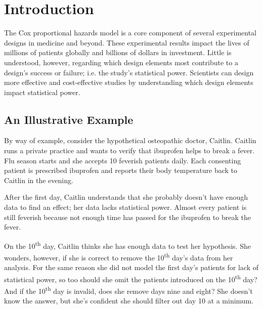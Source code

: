 \section{Introduction}

The Cox proportional hazards model \cite{cox} is a core component of several experimental designs in medicine and beyond. These experimental results impact the lives of millions of patients globally and billions of dollars in investment. Little is understood, however, regarding which design elements most contribute to a design's success or failure; i.e. the study's statistical power. Scientists can design more effective and cost-effective studies by understanding which design elements impact statistical power\footnotemark.


\subsection{An Illustrative Example}

By way of example, consider the hypothetical osteopathic doctor, Caitlin. Caitlin runs a private practice and wants to verify that ibuprofen helps to break a fever. Flu season starts and she accepts 10 feverish patients daily. Each consenting patient is prescribed ibuprofen and reports their body temperature back to Caitlin in the evening. 

After the first day, Caitlin understands that she probably doesn't have enough data to find an effect; her data lacks statistical power. Almost every patient is still feverish because not enough time has passed for the ibuprofen to break the fever. 

On the 10\textsuperscript{th} day, Caitlin thinks she has enough data to test her hypothesis. She wonders, however, if she is correct to remove the 10\textsuperscript{th} day's data from her analysis. For the same reason she did not model the first day's patients for lack of statistical power, so too should she omit the patients introduced on the 10\textsuperscript{th} day? And if the 10\textsuperscript{th} day is invalid, does she remove days nine and eight? She doesn't know the answer, but she's confident she should filter out day 10 at a minimum. 

